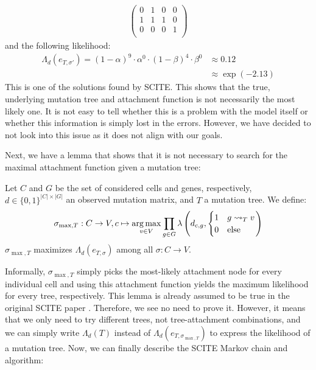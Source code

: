 \begin{example}
\begin{align*}
\begin{pmatrix}
            0 & 1 & 0 & 0 \\
            1 & 1 & 1 & 0 \\
            0 & 0 & 0 & 1 \\
        \end{pmatrix}
    \end{align*}
    and the following likelihood:
    \begin{align*}
        \Lambda_d(e_{T, \sigma'}) = (1-\alpha)^{9} \cdot \alpha^{0} \cdot (1-\beta)^{4} \cdot \beta^{0} &\approx 0.12 \\
        &\approx \exp(-2.13) 
    \end{align*}
    This is one of the solutions found by \ac{SCITE}. This shows that the true, underlying mutation tree and attachment function is not necessarily the most likely one. It is not easy to tell whether this is a problem with the model itself or whether this information is simply lost in the errors. However, we have decided to not look into this issue as it does not align with our goals.
\end{example}

Next, we have a lemma that shows that it is not necessary to search for the maximal attachment function given a mutation tree:

\begin{lemma}
    \label{lem:max_attachment}
    Let $C$ and $G$ be the set of considered cells and genes, respectively, $d \in \{0,1\}^{|C| \times |G|}$ an observed mutation matrix, and $T$ a mutation tree. We define:
    \begin{align*}
        \sigma_{\max, T}: C \rightarrow V, c \mapsto \operatorname*{arg\,max}_{v \in V} \prod_{g \in G} \lambda \left(d_{c,g}, \begin{cases}
            1 & g \leadsto_T v \\
            0 & \mathrm{else} \\
        \end{cases}\right)
    \end{align*}
    $\sigma_{\max, T}$ maximizes $\Lambda_d (e_{T, \sigma})$ among all $\sigma: C \rightarrow V$.
\end{lemma}

Informally, $\sigma_{\max, T}$ simply picks the most-likely attachment node for every individual cell and using this attachment function yields the maximum likelihood for every tree, respectively. This lemma is already assumed to be true in the original SCITE paper \cite{tree2016}. Therefore, we see no need to prove it. However, it means that we only need to try different trees, not tree-attachment combinations, and we can simply write $\Lambda_d(T)$ instead of $\Lambda_d(e_{T, \sigma_{\max, T}})$ to express the likelihood of a mutation tree. Now, we can finally describe the \ac{SCITE} Markov chain and algorithm:

